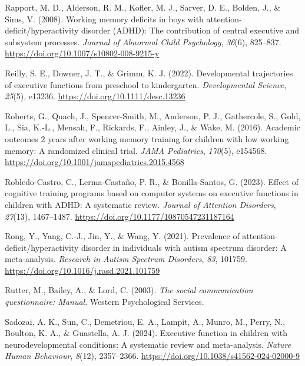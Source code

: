 \documentclass[
  letterpaper,
]{ut-thesis}
\newlength{\cslhangindent}
\newenvironment{CSLReferences}[2] %
 {\begin{list}{}{%
  \setlength{\itemindent}{0pt}
  \setlength{\leftmargin}{0pt}
  \setlength{\parsep}{0pt}
  \ifodd #1
   \setlength{\leftmargin}{\cslhangindent}
   \setlength{\itemindent}{-1\cslhangindent}
  \fi
  \setlength{\itemsep}{#2\baselineskip}}}
 {\end{list}}
\begin{document}
\begin{CSLReferences}{1}{0}
Rapport, M. D., Alderson, R. M., Kofler, M. J., Sarver, D. E., Bolden,
J., \& Sims, V. (2008). Working memory deficits in boys with
attention-deficit/hyperactivity disorder ({ADHD}): The contribution of
central executive and subsystem processes. \emph{Journal of Abnormal
Child Psychology}, \emph{36}(6), 825--837.
\url{https://doi.org/10.1007/s10802-008-9215-y}

Reilly, S. E., Downer, J. T., \& Grimm, K. J. (2022). Developmental
trajectories of executive functions from preschool to kindergarten.
\emph{Developmental Science}, \emph{25}(5), e13236.
\url{https://doi.org/10.1111/desc.13236}

Roberts, G., Quach, J., Spencer-Smith, M., Anderson, P. J., Gathercole,
S., Gold, L., Sia, K.-L., Mensah, F., Rickards, F., Ainley, J., \& Wake,
M. (2016). Academic outcomes 2 years after working memory training for
children with low working memory: A randomized clinical trial.
\emph{JAMA Pediatrics}, \emph{170}(5), e154568.
\url{https://doi.org/10.1001/jamapediatrics.2015.4568}

Robledo-Castro, C., Lerma-Castaño, P. R., \& Bonilla-Santos, G. (2023).
Effect of cognitive training programs based on computer systems on
executive functions in children with {ADHD}: A systematic review.
\emph{Journal of Attention Disorders}, \emph{27}(13), 1467--1487.
\url{https://doi.org/10.1177/10870547231187164}

Rong, Y., Yang, C.-J., Jin, Y., \& Wang, Y. (2021). Prevalence of
attention-deficit/hyperactivity disorder in individuals with autism
spectrum disorder: {A} meta-analysis. \emph{Research in Autism Spectrum
Disorders}, \emph{83}, 101759.
\url{https://doi.org/10.1016/j.rasd.2021.101759}

Rutter, M., Bailey, A., \& Lord, C. (2003). \emph{The social
communication questionnaire: {Manual}}. Western Psychological Services.

Sadozai, A. K., Sun, C., Demetriou, E. A., Lampit, A., Munro, M., Perry,
N., Boulton, K. A., \& Guastella, A. J. (2024). Executive function in
children with neurodevelopmental conditions: A systematic review and
meta-analysis. \emph{Nature Human Behaviour}, \emph{8}(12), 2357--2366.
\url{https://doi.org/10.1038/s41562-024-02000-9}


\end{CSLReferences}
\end{document}

